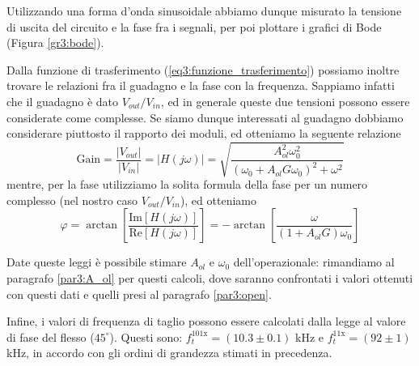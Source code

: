 Utilizzando una forma d'onda sinusoidale abbiamo dunque misurato la tensione di uscita del circuito e la fase fra i segnali, per poi plottare i grafici di Bode (Figura \ref{gr3:bode}).

Dalla funzione di trasferimento (\ref{eq3:funzione_trasferimento}) possiamo inoltre trovare le relazioni fra il guadagno e la fase con la frequenza. Sappiamo infatti che il guadagno è dato $V_{out}/V_{in}$, ed in generale queste due tensioni possono essere considerate come complesse. Se siamo dunque interessati al guadagno dobbiamo considerare piuttosto il rapporto dei moduli, ed otteniamo la seguente relazione
\begin{equation}
\mathrm{Gain}=\frac{|V_{out}|}{|V_{in}|}=|H(j\omega)|=\sqrt{\frac{A_{ol}^2 \omega_0^2}{(\omega_0 + A_{ol} G \omega_0)^2 + \omega^2}}
\label{eq3:fit_gain}
\end{equation}
mentre, per la fase utilizziamo la solita formula della fase per un numero complesso (nel nostro caso $V_{out}/V_{in}$), ed otteniamo
\begin{equation}
\varphi=\arctan\left[{\frac{\mathrm{Im}[H(j\omega)]}{\mathrm{Re}[H(j\omega)]}}\right]= - \arctan\left[\frac{\omega}{(1+A_{ol}G)\omega_0}\right]
\label{eq3:fit_fase}
\end{equation}

Date queste leggi è possibile stimare $A_{ol}$ e $\omega_0$ dell'operazionale: rimandiamo al paragrafo \ref{par3:A_ol} per questi calcoli, dove saranno confrontati i valori ottenuti con questi dati e quelli presi al paragrafo \ref{par3:open}.

Infine, i valori di frequenza di taglio possono essere calcolati dalla legge al valore di fase del flesso ($45^{\circ}$). Questi sono: $f_t^{101\mathrm{x}} = (10.3 \pm 0.1)$ \si{\kHz} e $f_t^{11\mathrm{x}} = (92 \pm 1)$ \si{\kHz}, in accordo con gli ordini di grandezza stimati in precedenza.